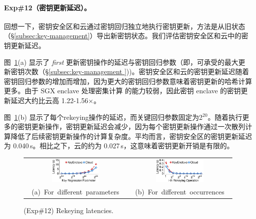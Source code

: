 \paragraph{Exp\#12（密钥更新延迟）。} 回想一下，密钥安全区和云通过密钥回归独立地执行密钥更新，方法是从旧状态（\S\ref{subsec:key-management}）导出新密钥状态。我们评估密钥安全区和云中的密钥更新延迟。

图~\ref{fig:rekeyingLatency}(a) 显示了 \textit{ first} 更新密钥操作的延迟与密钥回归参数（即，可承受的最大更新密钥次数（\S\ref{subsec:key-management }))。密钥安全区和云的密钥更新延迟随着密钥回归参数的增加而增加，因为更大的密钥回归参数意味着密钥更新的哈希计算更多。由于 SGX enclave 处理密集计算 \cite{harnik18} 的能力较弱，因此密钥 enclave 的密钥更新延迟大约比云高 1.22-1.56$\times$。

图~\ref{fig:rekeyingLatency}(b) 显示了每个rekeying操作的延迟，而关键回归参数固定为2$^{20}$。随着执行更多的密钥更新操作，密钥更新延迟会减少，因为每个密钥更新操作通过一次散列计算降低了后续密钥更新操作的计算复杂度。平均而言，密钥安全区的密钥更新延迟为 0.040\,s。相比之下，云的约为 0.027\,s，这意味着密钥更新开销是有限的。

\begin{figure}[t]
\centering
\begin{tabular}{@{\ }c@{\ }c}
\includegraphics[width=0.48\textwidth]{pic/sgxdedup/expa5_keyRegression_time.pdf} &
\includegraphics[width=0.48\textwidth]{pic/sgxdedup/expa5_keyRegression_time_default.pdf} \\
\mbox{\small (a) For different parameters} &
\mbox{\small (b) For different occurrences}
\end{tabular}
\caption{(Exp\#12) Rekeying latencies.}
\label{fig:rekeyingLatency}
\end{figure}
